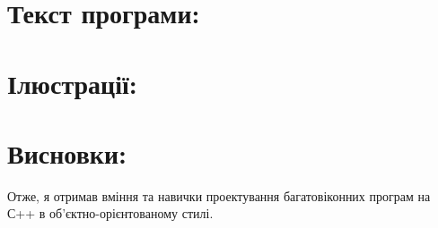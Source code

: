 \documentclass[14pt]{article}
\begin{document}
    \section{Текст програми:}
    


    \section{Ілюстрації:}
    


    \section{Висновки:}
    Отже, я отримав вміння та навички проектування багатовіконних програм на С++ в об’єктно-орієнтованому стилі.
\end{document}
